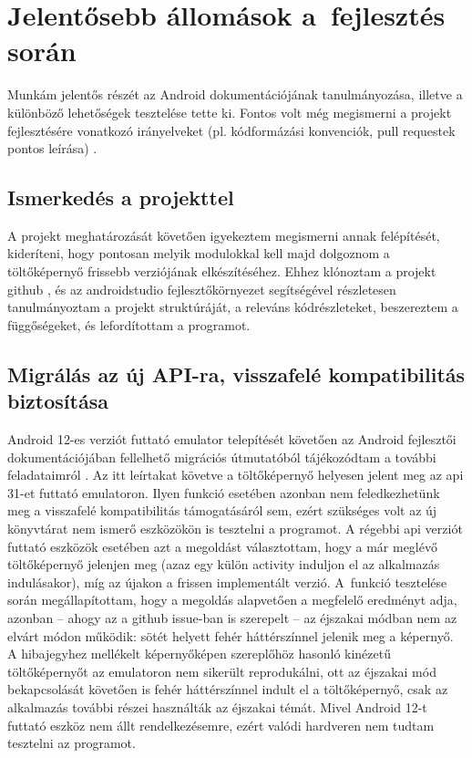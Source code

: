 \chapter{Jelentősebb állomások a~fejlesztés során}
Munkám jelentős részét az Android dokumentációjának tanulmányozása, illetve a különböző lehetőségek
tesztelése tette ki. Fontos volt még megismerni a projekt fejlesztésére vonatkozó irányelveket
(pl. kódformázási konvenciók, pull requestek pontos leírása) \cite{guidelines}.

\section{Ismerkedés a projekttel}
A projekt meghatározását követően igyekeztem megismerni annak felépítését, kideríteni, hogy
pontosan melyik modulokkal kell majd dolgoznom a töltőképernyő frissebb verziójának elkészítéséhez.
Ehhez klónoztam a projekt \gls{github} , és az \gls{androidstudio} fejlesztőkörnyezet
segítségével részletesen tanulmányoztam a projekt struktúráját, a releváns kódrészleteket,
beszereztem a függőségeket, és lefordítottam a programot.

\section{Migrálás az új API-ra, visszafelé kompatibilitás biztosítása}
Android 12-es verziót futtató \gls{emulator} telepítését követően az Android fejlesztői
dokumentációjában fellelhető migrációs útmutatóból tájékozódtam a további feladataimról \cite{splashscreenmigration}.
Az itt leírtakat követve a töltőképernyő helyesen jelent meg az \acrshort{api} 31-et futtató \gls{emulator}on.
Ilyen funkció esetében azonban nem feledkezhetünk meg a visszafelé kompatibilitás támogatásáról
sem, ezért szükséges volt az új könyvtárat nem ismerő eszközökön is tesztelni a programot.
A régebbi \acrshort{api} verziót futtató eszközök esetében azt a megoldást választottam, hogy a már meglévő
töltőképernyő jelenjen meg (azaz egy külön  \gls{activity} induljon el az alkalmazás
indulásakor), míg az újakon a frissen implementált verzió. A~funkció tesztelése során
megállapítottam, hogy a megoldás alapvetően a megfelelő eredményt adja, azonban -- ahogy az a
\gls{github} issue-ban is szerepelt \cite{issue} -- az éjszakai módban nem az elvárt módon működik: sötét helyett
fehér háttérszínnel jelenik meg a képernyő. A hibajegyhez mellékelt képernyőképen szereplőhöz
hasonló kinézetű töltőképernyőt az \gls{emulator}on nem sikerült reprodukálni, ott az éjszakai mód
bekapcsolását követően is fehér háttérszínnel indult el a töltőképernyő, csak az alkalmazás
további részei használták az éjszakai témát. Mivel Android 12-t futtató eszköz nem állt
rendelkezésemre, ezért valódi hardveren nem tudtam tesztelni az programot.

